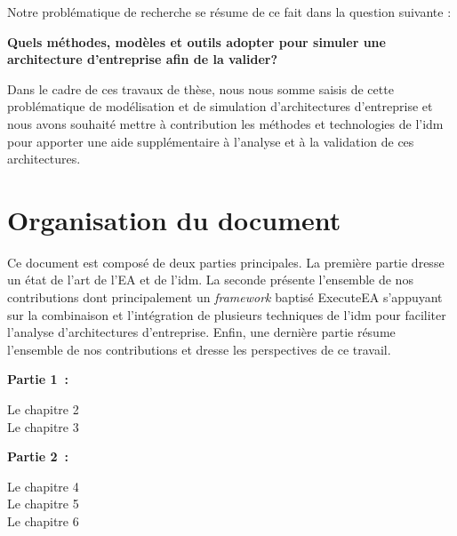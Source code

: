 Notre problématique de recherche se résume de ce fait dans la question suivante :

\vspace*{1em}
\begin{framed}
{\bfseries Quels méthodes, modèles et outils adopter pour simuler une 
architecture d'entreprise afin de la valider?}
\end{framed}

Dans le cadre de ces travaux de thèse, nous nous somme saisis de cette problématique
de modélisation et de simulation d'architectures d'entreprise et nous avons souhaité mettre à
contribution les méthodes et technologies de l'\gls{idm} pour apporter une aide supplémentaire
à l'analyse et à la validation de ces architectures.


\section{Organisation du document}

Ce document est composé de deux parties principales. La première partie dresse un état de l'art
de l'EA et de l'\gls{idm}. La seconde présente
l'ensemble de nos contributions dont principalement un \emph{framework} baptisé ExecuteEA
s'appuyant sur la combinaison et l'intégration de plusieurs techniques de l'\gls{idm} pour faciliter
l'analyse d'architectures d'entreprise. Enfin, une dernière partie résume l'ensemble de nos contributions
et dresse les perspectives de ce travail. 

\textbf{Partie 1~: }

    \begin{description}

        \item[Le chapitre 2] 


        \item[Le chapitre 3] 


    \end{description}

\textbf{Partie 2~: }

    \begin{description}

        \item[Le chapitre 4] 

        \item[Le chapitre 5] 

        \item[Le chapitre 6] 

    \end{description}

